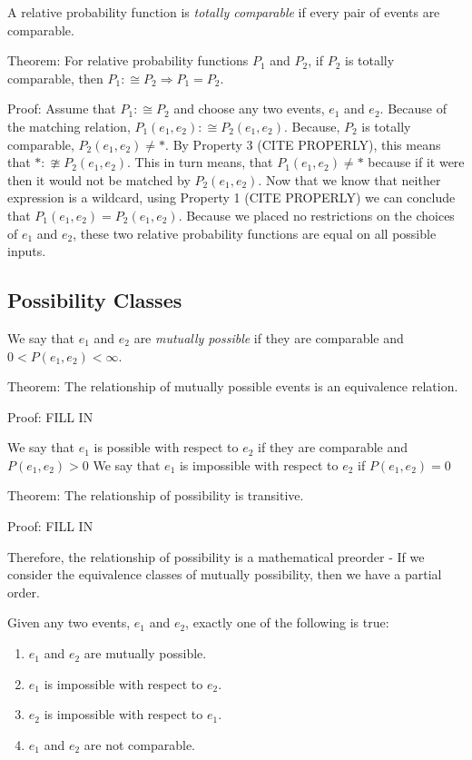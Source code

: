 \documentclass[twoside]{article}
\begin{document}
A relative probability function is \textit{totally comparable} if every pair of events are comparable. 

Theorem: For relative probability functions \(P_1\) and \(P_2\), if \(P_2\) is totally comparable, then \(P_1 :\cong P_2 \Rightarrow P_1 = P_2 \).

Proof: Assume that \(P_1 :\cong P_2\) and choose any two events, \(e_1\) and \(e_2\). Because of the matching relation, \(P_1(e_1, e_2) :\cong P_2(e_1, e_2)\). Because, \(P_2\) is totally comparable, \(P_2(e_1, e_2) \neq \ast\). By Property 3 (CITE PROPERLY), this means that \(\ast :\ncong P_2(e_1, e_2)\). This in turn means, that \(P_1(e_1, e_2) \neq \ast\) because if it were then it would not be matched by \(P_2(e_1, e_2)\). Now that we know that neither expression is a wildcard, using Property 1 (CITE PROPERLY) we can conclude that \(P_1(e_1, e_2) = P_2(e_1, e_2)\). Because we placed no restrictions on the choices of \(e_1\) and \(e_2\), these two relative probability functions are equal on all possible inputs.

\subsection{Possibility Classes}

We say that \(e_1\) and \(e_2\) are \textit{mutually possible} if they are comparable and\(0 < P(e_1, e_2) < \infty\).

Theorem: The relationship of mutually possible events is an equivalence relation.

Proof: FILL IN

We say that \(e_1\) is possible with respect to \(e_2\) if they are comparable and \(P(e_1, e_2) > 0\)
We say that \(e_1\) is impossible with respect to \(e_2\) if \(P(e_1, e_2) = 0\)

Theorem: The relationship of possibility is transitive.

Proof: FILL IN

Therefore, the relationship of possibility is a mathematical preorder
- If we consider the equivalence classes of mutually possibility, then we have a partial order.

Given any two events, \(e_1\) and \(e_2\), exactly one of the following is true:
\begin{enumerate}
  \item \(e_1\) and \(e_2\) are mutually possible.
  \item \(e_1\) is impossible with respect to \(e_2\).
  \item \(e_2\) is impossible with respect to \(e_1\).
  \item \(e_1\) and \(e_2\) are not comparable.
\end{enumerate}
\end{document}
